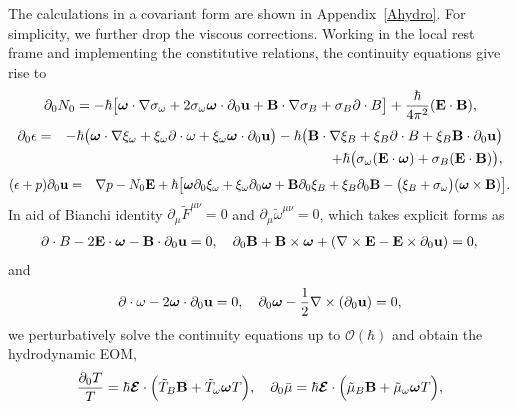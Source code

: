 \documentclass[aps,prd,showkeys,preprint,amsmath,amssymb,nofootinbib]{revtex4-1}
\begin{document}
The calculations in a covariant form are shown in 
Appendix~\ref{Ahydro}. For simplicity, we further drop the viscous corrections.
Working in the local rest frame and implementing the constitutive relations, the continuity equations give rise to
\begin{eqnarray} \label{DN0}
\partial_0 N_0
=-\hbar\big[{\bm\omega}\cdot\nabla \sigma_{\omega}+2\sigma_{\omega}{\bm \omega}\cdot \partial_0{\bf u}+{\bf B\cdot\nabla}\sigma_{B}+\sigma_{B}\partial\cdot B\big]+\frac{\hbar}{4\pi^2}({\bf E\cdot B}),
\end{eqnarray}
\begin{eqnarray}\nonumber
\partial_0\epsilon
&=&-\hbar\big({\bm\omega\cdot\nabla}\xi_{\omega}+\xi_{\omega}\partial\cdot \omega
+\xi_{\omega}{\bm\omega}\cdot\partial_0{\bf u}\big)
-\hbar\big({\bf B\cdot\nabla}\xi_{B}+\xi_{B}\partial\cdot B
+\xi_{B}{\bf B}\cdot\partial_0{\bf u}\big)
\\
&&+\hbar \big(\sigma_{\omega}({\bf E\cdot\bm{\omega}})+\sigma_B({\bf E\cdot B})\big),
\end{eqnarray}
\begin{eqnarray} \label
-(\epsilon+p)\partial_0{\bf u}
&=&\nabla p-N_0{\bf E}
+\hbar\big[{\bm\omega}\partial_0\xi_{\omega}+\xi_{\omega}\partial_0{\bm\omega}
+{\bf B}\partial_0\xi_{B}+\xi_{B}\partial_0{\bf B}
-\big(\xi_B+\sigma_{\omega}\big)({\bm{\omega}\times\bf B})
\big].
\end{eqnarray}
In aid of Bianchi identity $\partial_{\mu}\tilde{F}^{\mu\nu}=0$ and $\partial_{\mu}\tilde{\omega}^{\mu\nu}=0$, which takes explicit forms as
\begin{eqnarray}\label{Bianchi_identity_EM}
\partial\cdot B-2{\bf E\cdot\bm\omega}-{\bf B}\cdot\partial_0{\bf u}=0,\quad
\partial_0{\bf B}+{\bf B\times\bm{\omega}}+({\bf \nabla\times E}-{\bf E}\times\partial_0{\bf u})=0,
\end{eqnarray}
and
\begin{eqnarray}\label{Bianchi_identity_omega}
\partial\cdot\omega-2{\bm{\omega}}\cdot\partial_0{\bf u}=0,\quad
\partial_0{\bm\omega}-\frac{1}{2}\nabla\times(\partial_0{\bf u})=0,
\end{eqnarray}
we perturbatively solve the continuity equations up to $\mathcal{O}(\hbar)$ and obtain the hydrodynamic EOM,
	\begin{eqnarray}\label{D0T_D0mu}
	\frac{\partial_0T}{T}=\hbar\bm{\mathcal{E}}\cdot\Big(\tilde{T}_B{\bf B}+\tilde{T}_{\omega}\bm{\omega}T\Big),\quad
	\partial_0\bar{\mu}=\hbar\bm{\mathcal{E}}\cdot\Big(\tilde{\mu}_B{\bf B}+\tilde{\mu}_{\omega}\bm{\omega}T\Big),
	\end{eqnarray}
\end{document}
